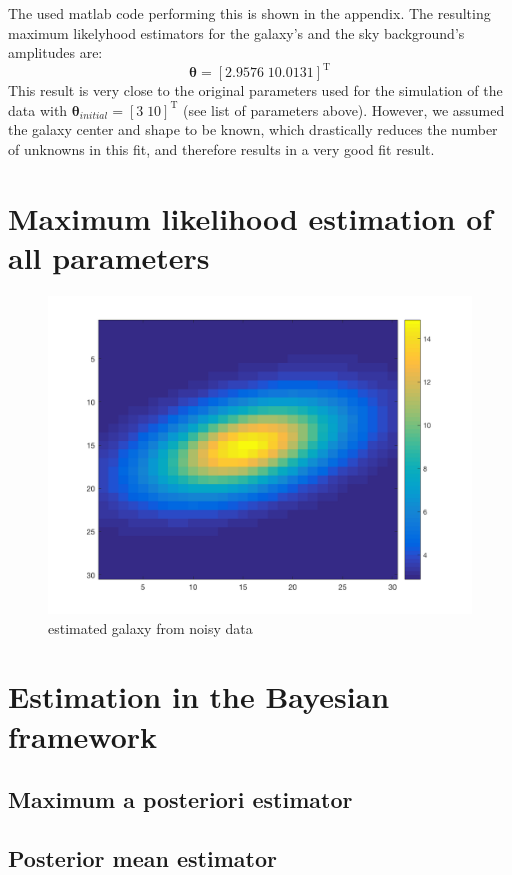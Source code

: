 The used matlab code performing this is shown in the appendix. The resulting maximum likelyhood estimators for the galaxy's and the sky background's amplitudes are:
\begin{equation*}
\boldsymbol{\theta}=\left[2.9576\;10.0131 \right]^{\mathrm{T}}
\end{equation*}
This result is very close to the original parameters used for the simulation of the data with $ \boldsymbol{\theta}_{initial}=\left[3\;10 \right]^{\mathrm{T}}$ (see list of parameters above). However, we assumed the galaxy center and shape to be known, which drastically reduces the number of unknowns in this fit, and therefore results in a very good fit result.

\section{Maximum likelihood estimation of all parameters}

\begin{figure}[h!]
	\centering
	\includegraphics[width=\textwidth/2]{images/galaxy_MLE}
	\caption{estimated galaxy from noisy data}
	\label{fig:MLE}
\end{figure}


\section{Estimation in the Bayesian framework}

\subsection{Maximum a posteriori estimator}

\subsection{Posterior mean estimator}


